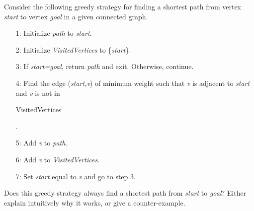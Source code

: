 Consider the following greedy strategy for finding a shortest path
from vertex {\em start} to vertex {\em goal} in a given connected graph.

\begin{enumerate}
  
\item  [1:] Initialize {\em path} to {\em start}.
  
\item  [2:] Initialize {\em VisitedVertices} to \{{\em start}\}.
  
\item  [3:] If {\em start=goal}, return {\em path} and exit.
  Otherwise, continue.
  
\item  [4:] Find the edge ({\em start,v}) of minimum weight such that
  {\em v} is adjacent to {\em start} and {\em v} is not in {\em

    VisitedVertices}.
  
\item  [5:] Add {\em v} to {\em path}.
  
\item  [6:] Add {\em v} to {\em VisitedVertices}.

\item  [7:] Set {\em start} equal to {\em v} and go to step 3.

\end{enumerate}

Does this greedy strategy always find a shortest path from {\em start}
to {\em goal}?  Either explain intuitively why it works, or give a
counter-example.

